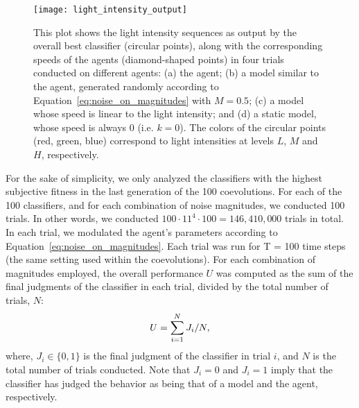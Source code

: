 \begin{figure*}[!t]
	\centering
			\texttt{[image: light\_intensity\_output]}
			\caption{This plot shows the light intensity sequences as output by the overall best classifier (circular points), along with the corresponding speeds of the agents (diamond-shaped points) in four trials conducted on different agents: (a) the agent; (b) a model similar to the agent, generated randomly according to Equation~\ref{eq:noise_on_magnitudes} with $M=0.5$; (c) a model whose speed is linear to the light intensity; and (d) a static model, whose speed is always $0$ (i.e. $k=0$).
The colors of the circular points (red, green, blue) correspond to light intensities at levels $L$, $M$ and $H$, respectively.\label{fig:post_evaluation_light_output}}
\end{figure*}

For the sake of simplicity, we only analyzed the classifiers with the highest subjective fitness in the last generation of the 100 coevolutions. For each of the 100 classifiers, and for each combination of noise magnitudes, we conducted 100 trials. In other words, we conducted $100 \cdot 11^4 \cdot 100 = 146,410,000$ trials in total. 
In each trial, we modulated the agent's parameters according to Equation~\ref{eq:noise_on_magnitudes}.
Each trial was run for T = 100 time steps (the same setting used within the coevolutions). 
For each combination of magnitudes employed, the overall performance $U$ was computed as the sum of the final judgments of the classifier in each trial, divided by the total number of trials, $N$: 
\begin{equation}{\label{eq:performance_metric_model}}
U = \sum\limits_{i = 1}^{N} {{J_i}}/N,
\end{equation}
where, $J_i\in\{0,1\}$ is the final judgment of the classifier in trial $i$, and $N$ is the total number of trials conducted. Note that $J_i = 0$ and $J_i = 1$ imply that the classifier has judged the behavior as being that of a model and the agent, respectively.

